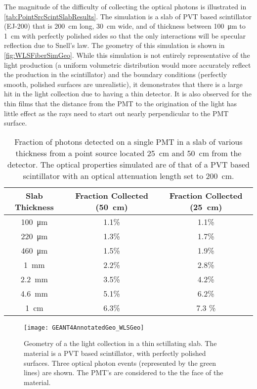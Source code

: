 The magnitude of the difficulty of collecting the optical photons is illustrated in \autoref{tab:PointSrcScintSlabResults}.
The simulation is a slab of PVT based scintillator (EJ-200) that is  \SI{200}{\cm} long, \SI{30}{\cm} wide, and of thickness between \SI{100}{\um} to \SI{1}{\cm} with perfectly polished sides so that the only interactions will be specular reflection due to Snell's law.
The geometry of this simulation is shown in \autoref{fig:WLSFiberSimGeo}.
While this simulation is not entirely representative of the light production (a uniform volumetric distribution would more accurately reflect the production in the scintillator) and the boundary conditions (perfectly smooth, polished surfaces are unrealistic), it demonstrates that there is a large hit in the light collection due to having a thin detector.
It is also observed for the thin films that the distance from the PMT to the origination of the light has little effect as the rays need to start out nearly perpendicular to the PMT surface.
\begin{table}
	\caption[Fraction of Photons Detected from a Point Source on a single PMT]{Fraction of photons detected on a single PMT in a slab of various thickness from a point source located \SI{25}{\cm} and \SI{50}{\cm} from the detector.  The optical properties simulated are of that of a PVT based scintillator with an optical attenuation length set to \SI{200}{\cm}.}
	\label{tab:PointSrcScintSlabResults}
	\begin{tabular}{c | c  c}
	\toprule
	Slab Thickness & Fraction Collected (\SI{50}{\cm}) & Fraction Collected (\SI{25}{\cm}) \\
	\midrule
	\SI{100}{\um} & 1.1\% & 1.1\% \\
	\SI{220}{\um} & 1.3\% & 1.7\% \\
	\SI{460}{\um} & 1.5\% & 1.9\% \\
	\SI{1}{\mm} & 2.2\% & 2.8\% \\
	\SI{2.2}{\mm} & 3.5\% & 4.2\% \\
	\SI{4.6}{\mm} & 5.1\% & 6.2\% \\
	\SI{1}{\cm} & 6.3\% & 7.3 \% \\
	\bottomrule
	\end{tabular}
\end{table}
\begin{figure}
	\centering
	\texttt{[image: GEANT4AnnotatedGeo\_WLSGeo]}
	\caption[Thin Slab Light Collection Geometry]{Geometry of a the light collection in a thin sctillating slab. The material is a PVT based scintillator, with perfectly polished surfaces. Three optical photon events (represented by the green lines) are shown. The PMT's are considered to the the face of the material.}
	\label{fig:WLSFiberSimGeo}
\end{figure}
